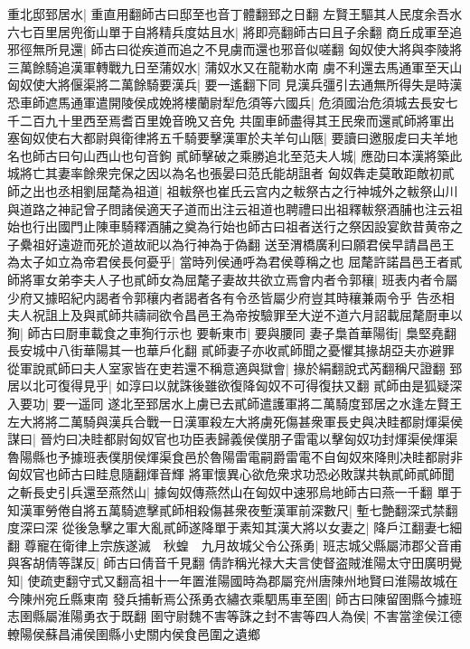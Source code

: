 重北邸郅居水|{
	重直用翻師古曰邸至也音丁體翻郅之日翻}
左賢王驅其人民度余吾水六七百里居兜銜山單于自將精兵度姑且水|{
	將即亮翻師古曰且子余翻}
商丘成軍至追邪徑無所見還|{
	師古曰從疾道而追之不見虜而還也邪音似嗟翻}
匈奴使大將與李陵將三萬餘騎追漢軍轉戰九日至蒲奴水|{
	蒲奴水又在龍勒水南}
虜不利還去馬通軍至天山匈奴使大將偃渠將二萬餘騎要漢兵|{
	要一遙翻下同}
見漢兵彊引去通無所得失是時漢恐車師遮馬通軍遣開陵侯成娩將樓蘭尉犁危須等六國兵|{
	危須國治危須城去長安七千二百九十里西至焉耆百里娩音晩又咅免}
共圍車師盡得其王民衆而還貳師將軍出塞匈奴使右大都尉與衛律將五千騎要擊漢軍於夫羊句山陿|{
	要讀曰邀服䖍曰夫羊地名也師古曰句山西山也句音鉤}
貳師擊破之乘勝追北至范夫人城|{
	應劭曰本漢將築此城將亡其妻率餘衆完保之因以為名也張晏曰范氏能胡詛者}
匈奴犇走莫敢距敵初貳師之出也丞相劉屈氂為祖道|{
	祖軷祭也崔氏云宫内之軷祭古之行神城外之軷祭山川與道路之神記曾子問諸侯適天子道而出注云祖道也聘禮曰出祖釋軷祭酒脯也注云祖始也行出國門止陳車騎釋酒脯之奠為行始也師古曰祖者送行之祭因設宴飲昔黄帝之子纍祖好遠遊而死於道故祀以為行神為于偽翻}
送至渭橋廣利曰願君侯早請昌邑王為太子如立為帝君侯長何憂乎|{
	當時列侯通呼為君侯尊稱之也}
屈氂許諾昌邑王者貳師將軍女弟李夫人子也貳師女為屈氂子妻故共欲立焉會内者令郭穰|{
	班表内者令屬少府又據昭紀内謁者令郭穰内者謁者各有令丞皆屬少府豈其時穰兼兩令乎}
告丞相夫人祝詛上及與貳師共禱祠欲令昌邑王為帝按驗罪至大逆不道六月詔載屈氂㕑車以狥|{
	師古曰㕑車載食之車狥行示也}
要斬東市|{
	要與腰同}
妻子梟首華陽街|{
	梟堅堯翻長安城中八街華陽其一也華戶化翻}
貳師妻子亦收貳師聞之憂懼其掾胡亞夫亦避罪從軍說貳師曰夫人室家皆在吏若還不稱意適與獄會|{
	掾於絹翻說式芮翻稱尺證翻}
郅居以北可復得見乎|{
	如淳曰以就誅後雖欲復降匈奴不可得復扶又翻}
貳師由是狐疑深入要功|{
	要一遥同}
遂北至郅居水上虜已去貳師遣護軍將二萬騎度郅居之水逢左賢王左大將將二萬騎與漢兵合戰一日漢軍殺左大將虜死傷甚衆軍長史與决眭都尉煇渠侯謀曰|{
	晉灼曰决眭都尉匈奴官也功臣表歸義侯僕朋子雷電以擊匈奴功封煇渠侯煇渠魯陽縣也予據班表僕朋侯煇渠食邑於魯陽雷電嗣爵雷電不自匈奴來降則决眭都尉非匈奴官也師古曰眭息隨翻煇音輝}
將軍懷異心欲危衆求功恐必敗謀共執貳師貳師聞之斬長史引兵還至燕然山|{
	據匈奴傳燕然山在匈奴中速邪烏地師古曰燕一千翻}
單于知漢軍勞倦自將五萬騎遮擊貳師相殺傷甚衆夜塹漢軍前深數尺|{
	塹七艶翻深式禁翻度深曰深}
從後急擊之軍大亂貳師遂降單于素知其漢大將以女妻之|{
	降戶江翻妻七細翻}
尊寵在衛律上宗族遂滅　秋蝗　九月故城父令公孫勇|{
	班志城父縣屬沛郡父音甫}
與客胡倩等謀反|{
	師古曰倩音千見翻}
倩詐稱光禄大夫言使督盗賊淮陽太守田廣明覺知|{
	使疏吏翻守式又翻高祖十一年置淮陽國時為郡屬兖州唐陳州地賢曰淮陽故城在今陳州宛丘縣東南}
發兵捕斬焉公孫勇衣繡衣乘駟馬車至圉|{
	師古曰陳留圉縣今據班志圉縣屬淮陽勇衣于既翻}
圉守尉魏不害等誅之封不害等四人為侯|{
	不害當塗侯江德轑陽侯蘇昌浦侯圉縣小史關内侯食邑圍之遺鄉}
